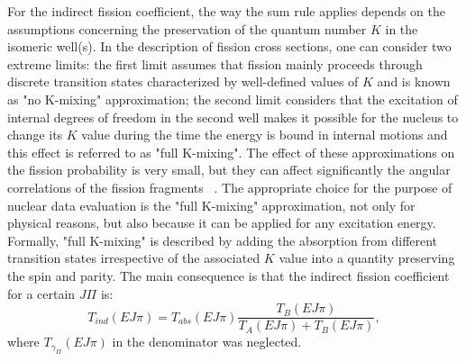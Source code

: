 \documentclass[twocolumn,amsmath,amssymb,10pt,groupedaddress,letter]{revtex4}
\begin{document}
For the indirect fission coefficient, the way the sum rule applies depends on the assumptions
concerning the preservation of the quantum number $K$ in the isomeric well(s).
In the description of fission cross sections, one can consider two extreme
limits: the first limit assumes that fission mainly proceeds through discrete
transition states characterized by well-defined values of $K$ and is known as
"no K-mixing" approximation; the second limit considers that the excitation of
internal degrees of freedom in the second well makes it possible for the
nucleus to change its $K$ value during the time the energy is bound in
internal motions and this effect is referred to as "full K-mixing". The effect
of these approximations on the fission probability is very small, but they can
affect significantly the angular correlations of the fission fragments
~\cite{Back:74}. The appropriate choice for the purpose of nuclear data
evaluation is the "full K-mixing" approximation, not only for physical
reasons, but also because it can be applied for any excitation energy.
Formally, "full K-mixing" is described by adding the absorption from different
transition states irrespective of the associated $K$ value into a quantity
preserving the spin and parity. The main consequence is that the indirect fission
coefficient for a certain $J\Pi$ is:
%
\begin{equation}
T_{ind}(E J \pi)=T_{abs}(E J \pi)\frac{T_{B}(E J \pi)}{T_{A}(E J \pi)+T_{B}(E J \pi)},
\label{tind1}
\end{equation}
%
where $T_{\gamma_{II}}(E J \pi)$ in the denominator was neglected.
\end{document}
